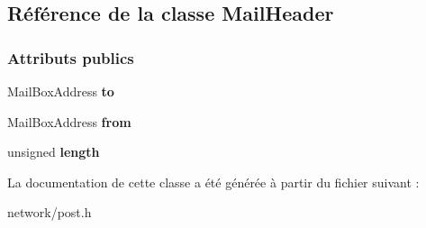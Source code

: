 \hypertarget{class_mail_header}{}\subsection{Référence de la classe Mail\+Header}
\label{class_mail_header}
\subsubsection*{Attributs publics}
\begin{DoxyCompactItemize}
\item 
\hypertarget{class_mail_header_ae89eec1e19689892edbeed1a98782c3a}{}\label{class_mail_header_ae89eec1e19689892edbeed1a98782c3a} 
Mail\+Box\+Address {\bfseries to}
\item 
\hypertarget{class_mail_header_aecd770168405c941b31ff1baf390df79}{}\label{class_mail_header_aecd770168405c941b31ff1baf390df79} 
Mail\+Box\+Address {\bfseries from}
\item 
\hypertarget{class_mail_header_a58dab2045076ca8bdd8bb43f21025104}{}\label{class_mail_header_a58dab2045076ca8bdd8bb43f21025104} 
unsigned {\bfseries length}
\end{DoxyCompactItemize}


La documentation de cette classe a été générée à partir du fichier suivant \+:\begin{DoxyCompactItemize}
\item 
network/post.\+h\end{DoxyCompactItemize}
